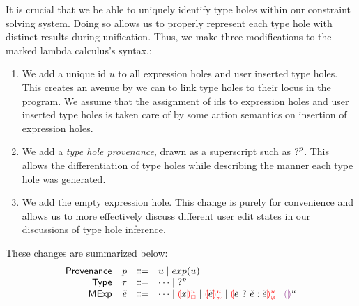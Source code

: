 \label{sec:typinf}
It is crucial that we be able to uniquely identify type holes within our constraint solving system. Doing so allows us to properly represent each type hole with distinct results during unification. Thus, we make three modifications to the marked lambda calculus's syntax.:
\begin{enumerate}
    \item We add a unique id $u$ to all expression holes and user inserted type holes. This creates an avenue by we can to link type holes to their locus in the program. We assume that the assignment of ids to expression holes and user inserted type holes is taken care of by some action semantics on insertion of expression holes. 
    \item We add a \emph{type hole provenance}, drawn as a superscript such as $\mathtt{?}^p$. This allows the differentiation of type holes while describing the manner each type hole was generated.
    \item We add the empty expression hole. This change is purely for convenience and allows us to more effectively discuss different user edit states in our discussions of type hole inference.
\end{enumerate}
  
These changes are summarized below:
\[\begin{array}{rrcl}
    \Prov & \Provp & \Coloneqq & u \mid exp(u) \\
    \TMName  & \TMV  & \Coloneqq & \dots \mid \TUnknown^{p}\\
    \ECMName & \ECMV & \Coloneqq & \dots \mid \ECUnboundId{x}{u} \mid \ECInconTypeId{\ECMV}{u} \mid \ECInconBrId{\ECMV}{\ECMV}{\ECMV}{u} \mid \EEHole^u
\end{array}\]

